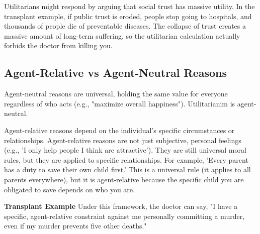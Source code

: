 \documentclass[12pt]{article}
\begin{document}
Utilitarians might respond by arguing that social trust has massive utility.
In the transplant example, if public trust is eroded, people stop going to hospitals, and thousands of people die of preventable diseases.
The collapse of trust creates a massive amount of long-term suffering, so the utilitarian calculation actually forbids the doctor from killing you.

\subsection{Agent-Relative vs Agent-Neutral Reasons}
Agent-neutral reasons are universal, holding the same value for everyone regardless of who acts (e.g., "maximize overall happiness").
Utilitarianim is agent-neutral.

\noindent Agent-relative reasons depend on the individual's specific circumstances or relationships.
Agent-relative reasons are not just subjective, personal feelings (e.g., 'I only help people I think are attractive').
They are still universal moral rules, but they are applied to specific relationships.
For example, 'Every parent has a duty to save their own child first.'
This is a universal rule (it applies to all parents everywhere), but it is agent-relative because the specific child you are obligated to save depends on who you are.

\noindent\textbf{Transplant Example} Under this framework, the doctor can say, "I have a specific, agent-relative constraint against me personally committing a murder, even if my murder prevents five other deaths."
\end{document}
